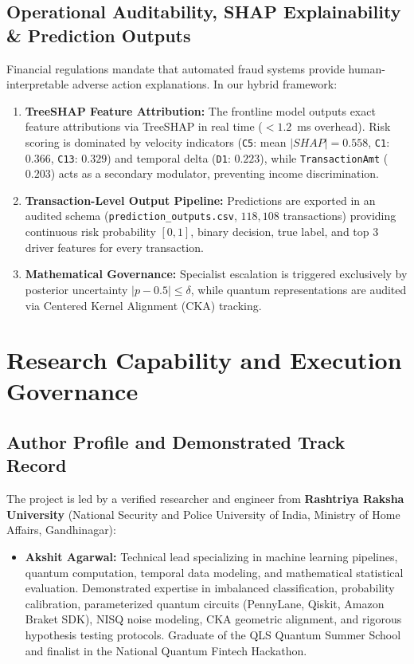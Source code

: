 \documentclass[10pt,a4paper]{article}
\begin{document}
\subsection{Operational Auditability, SHAP Explainability \& Prediction Outputs}
Financial regulations mandate that automated fraud systems provide human-interpretable adverse action explanations. In our hybrid framework:
\begin{enumerate}[leftmargin=*,itemsep=0.1pt,topsep=0.5pt]
\item \textbf{TreeSHAP Feature Attribution:} The frontline model outputs exact feature attributions via TreeSHAP in real time ($<1.2$~ms overhead). Risk scoring is dominated by velocity indicators (\texttt{C5}: mean $|SHAP|=0.558$, \texttt{C1}: $0.366$, \texttt{C13}: $0.329$) and temporal delta (\texttt{D1}: $0.223$), while \texttt{TransactionAmt} ($0.203$) acts as a secondary modulator, preventing income discrimination.
\item \textbf{Transaction-Level Output Pipeline:} Predictions are exported in an audited schema (\texttt{prediction\_outputs.csv}, $118,108$ transactions) providing continuous risk probability $[0, 1]$, binary decision, true label, and top 3 driver features for every transaction.
\item \textbf{Mathematical Governance:} Specialist escalation is triggered exclusively by posterior uncertainty $|p - 0.5| \le \delta$, while quantum representations are audited via Centered Kernel Alignment (CKA) tracking.
\end{enumerate}

\clearpage


\section{Research Capability and Execution Governance}

\subsection{Author Profile and Demonstrated Track Record}
The project is led by a verified researcher and engineer from \textbf{Rashtriya Raksha University} (National Security and Police University of India, Ministry of Home Affairs, Gandhinagar):
\begin{itemize}[leftmargin=*,itemsep=1.2pt,topsep=1pt]
\item \textbf{Akshit Agarwal:} Technical lead specializing in machine learning pipelines, quantum computation, temporal data modeling, and mathematical statistical evaluation. Demonstrated expertise in imbalanced classification, probability calibration, parameterized quantum circuits (PennyLane, Qiskit, Amazon Braket SDK), NISQ noise modeling, CKA geometric alignment, and rigorous hypothesis testing protocols. Graduate of the QLS Quantum Summer School and finalist in the National Quantum Fintech Hackathon.
\end{itemize}
\end{document}

